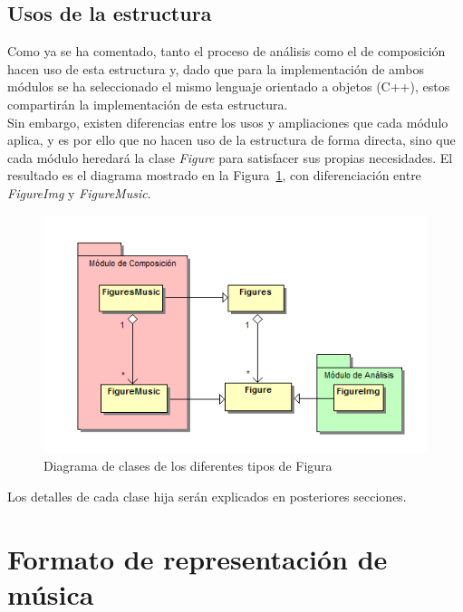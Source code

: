 			
\subsection{Usos de la estructura}	

	Como ya se ha comentado, tanto el proceso de análisis como el de composición hacen uso de esta estructura y, dado que para la implementación de ambos módulos se ha seleccionado el mismo lenguaje orientado a objetos (C++), estos compartirán la implementación de esta estructura.\\
	
	Sin embargo, existen diferencias entre los usos y ampliaciones que cada módulo aplica, y es por ello que no hacen uso de la estructura de forma directa,  sino que cada módulo heredará la clase \emph{Figure} para satisfacer sus propias necesidades. El resultado es el diagrama mostrado en la Figura~\ref{fig:diagramaFigMupPhic}, con diferenciación entre \emph{FigureImg} y \emph{FigureMusic}.\\

		\begin{figure}[htbp]
		\centering
		\includegraphics[scale=0.5]{graphics/diagramaFigMupPhic.png}
		\caption{Diagrama de clases de los diferentes tipos de Figura}
		\label{fig:diagramaFigMupPhic}
		\end{figure}
		
	Los detalles de cada clase hija serán explicados en posteriores secciones.	


\section{Formato de representación de música}



